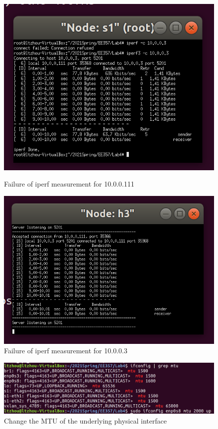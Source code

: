 \begin{exercise}[]
\begin{solution}
  \begin{figure}[ht]
    \begin{center}
    \begin{minipage}[t]{0.48\linewidth}
        \centering
        \includegraphics[width=0.7\linewidth]{img/lab4/ex2-2-1.png}
        \caption{Failure of iperf measurement for 10.0.0.111}
        \label{fig:ex2-2-1}
    \end{minipage}
    \begin{minipage}[t]{0.48\linewidth}
        \centering
        \includegraphics[width=0.7\linewidth]{img/lab4/ex2-2-2.png}
        \caption{Failure of iperf measurement for 10.0.0.3}
        \label{fig:ex2-2-2}
    \end{minipage}
    \end{center}
  \end{figure}

  \begin{figure}[ht]
    \begin{center}
    \includegraphics[width=12cm]{img/lab4/ex2-2-6.png}
    \caption{Change the MTU of the underlying physical interface}
    \label{fig:ex2-2-6}
    \end{center}
  \end{figure}


\end{solution}
\end{exercise}
